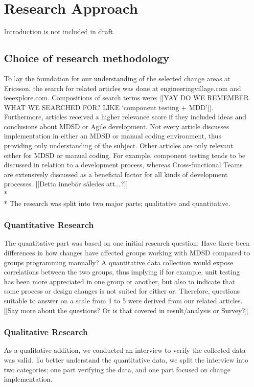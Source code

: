 \documentclass[final_report_innit.tex]{subfiles}
\begin{document}
\section{Research Approach}
Introduction is not included in draft.

\subsection{Choice of research methodology}
To lay the foundation for our understanding of the selected change areas at Ericsson, the search for related articles was done at engineeringvillage.com and ieeexplore.com. Compositions of search terms were; [[YAY DO WE REMEMBER WHAT WE SEARCHED FOR? LIKE `component testing + MDD']]. Furthermore, articles received a higher relevance score if they included ideas and conclusions about MDSD or Agile development. Not every article discusses implementation in either an MDSD or manual coding environment, thus providing only understanding of the subject. Other articles are only relevant either for MDSD or manual coding. For example, component testing tends to be discussed in relation to a development process, whereas Cross-functional Teams are extensively discussed as a beneficial factor for all kinds of development processes. [[Detta innebär således att...?]]
\\*
\\*
The research was split into two major parts; qualitative and quantitative.

\subsubsection{Quantitative Research}
The quantitative part was based on one initial research question; Have there been differences in how changes have affected groups working with MDSD compared to groups programming manually? A quantitative data collection would expose correlations between the two groups, thus implying if for example, unit testing has been more appreciated in one group or another, but also to indicate that some process or design changes is not suited for either or. Therefore, questions suitable to answer on a scale from 1 to 5 were derived from our related articles. [[Say more about the questions? Or is that covered in result/analysis or Survey?]]

\subsubsection{Qualitative Research}
As a qualitative addition, we conducted an interview to verify the collected data was valid. To better understand the quantitative data, we split the interview into two categories; one part verifying the data, and one part focused on change implementation.
\end{document}
